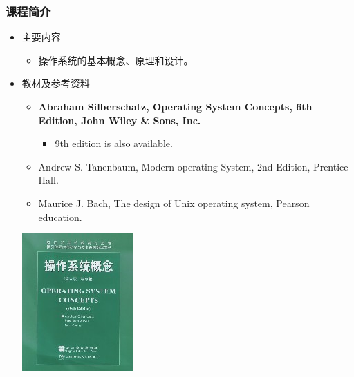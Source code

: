 \documentclass[CJKutf8,xcolor=pdftex,dvipsnames,table]{beamer}
\begin{document}
\begin{CJK*}{UTF8}{song}
  \begin{frame}
    \frametitle{课程简介} \pause
	  \begin{itemize}
	    \item{主要内容} \pause
	      \begin{itemize}
	      \item{操作系统的基本概念、原理和设计。} \pause
	      \end{itemize}
	    \item{教材及参考资料} \pause
	      \begin{itemize}
	      \item{\textbf{Abraham Silberschatz, Operating System Concepts, 6th Edition, John Wiley \& Sons, Inc.}} \pause
	        \begin{itemize}
	        \item{9th edition is also available.} \pause
	        \end{itemize}
	      \item{Andrew S. Tanenbaum, Modern operating System, 2nd Edition, Prentice Hall.} \pause
	      \item{Maurice J. Bach, The design of Unix operating system, Pearson education.} \pause
	      \end{itemize}
	    \begin{center}
	    	\includegraphics[scale=0.4]{oscv6}  \pause
			\hspace{1mm}

\end{center}
\end{itemize}
\end{frame}
\end{CJK*}
\end{document}
